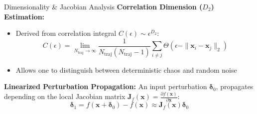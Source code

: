 \documentclass[10pt,aspectratio=169]{beamer}
\begin{document}
\begin{frame}{Dimensionality \& Jacobian Analysis}
  \textbf{Correlation Dimension ($D_2$) Estimation:}
  \begin{itemize}
    \item Derived from correlation integral $C(\epsilon) \sim \epsilon^{D_2}$:
      \begin{equation*}
        C(\epsilon) = \lim_{N_{\text{traj}} \to \infty} \frac{1}{N_{\text{traj}}(N_{\text{traj}}-1)} \sum_{i \ne j} \Theta(\epsilon - \|\mathbf{x}_i - \mathbf{x}_j\|_2)
      \end{equation*}
    \item Allows one to distinguish between deterministic chaos and random noise
  \end{itemize}

  \textbf{Linearized Perturbation Propagation:}
  An input perturbation $\bm{\delta}_0$, propagates depending on the local Jacobian matrix $\mathbf{J}_f(\mathbf{x}) = \frac{\partial f(\mathbf{x})}{\partial \mathbf{x}}$:
  \begin{equation*}
    \bm{\delta}_1 = f(\mathbf{x} + \bm{\delta}_0) - f(\mathbf{x}) \approx \mathbf{J}_f(\mathbf{x}) \bm{\delta}_0
  \end{equation*}
  
\end{frame}

  
\end{document}
